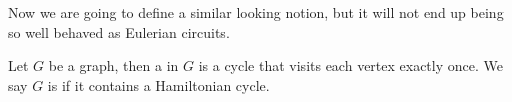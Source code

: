 \documentclass[a4paper]{scrartcl}
\begin{document}
Now we are going to define a similar looking notion, but it will not end up being so well behaved as Eulerian circuits. 

\begin{definition}
	Let $G$ be a graph, then a  in $G$ is a cycle that visits each vertex exactly once. We say $G$ is  if it contains a Hamiltonian cycle.
\end{definition}

\begin{center}
	


\begin{tikzpicture}[x=0.75pt,y=0.75pt,yscale=-1,xscale=1]


\end{tikzpicture}
\end{center}
\end{document}
